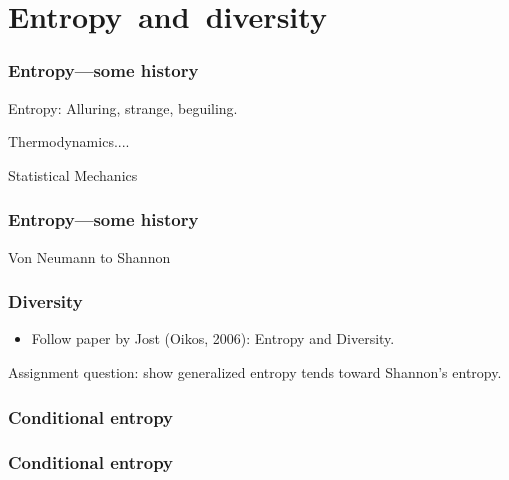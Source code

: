 \section{Entropy\ and\ diversity}

\begin{frame}
\frametitle{Entropy---some history}

Entropy: Alluring, strange, beguiling.

Thermodynamics....

Statistical Mechanics





\end{frame}


\begin{frame}
\frametitle{Entropy---some history}

Von Neumann to Shannon


\end{frame}

\begin{frame}
\frametitle{Diversity}


\end{frame}



\begin{frame}

  \begin{itemize}
  \item 
    Follow paper by Jost (Oikos, 2006):
    Entropy and Diversity\cite{jost2006a}.
  \end{itemize}

\end{frame}

\begin{frame}


  Assignment question: show generalized entropy tends
  toward Shannon's entropy.
\end{frame}

\begin{frame}
  \frametitle{Conditional entropy}
  
\end{frame}

\begin{frame}
  \frametitle{Conditional entropy}
  
\end{frame}
